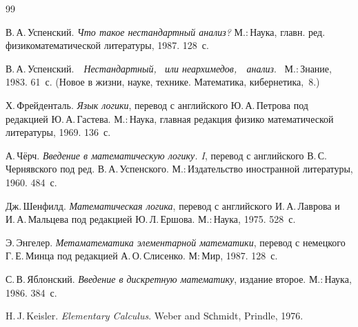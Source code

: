 \begin{thebibliography}{99}

В.\,А.\,Успенский. \textit{Что такое нестандартный анализ?}
М.:\,Нау\-ка, главн. ред. физико\д математической литературы,
1987. 128~с.


В.\,А.\,Успенский.\ \ \textit{Нестандартный, \ или неархимедов,\ \
анализ}. \ М.:\,Знание, 1983. 61~с. (Новое в жизни, науке, технике.
Математика, кибернетика, \номер\,8.)


Х.\,Фрейденталь. \textit{Язык логики}, перевод с английского Ю.\,А.\,Пет\-ро\-ва
под редакцией Ю.\,А.\,Гастева. М.:\,Наука, главная редакция физико\д
математичес\-кой литературы, 1969. 136~с.



А.\,Чёрч. \textit{Введение в математическую логику. I},
перевод с английского В.\,С.\,Чернявского под ред.
В.\,А.\,Успенского. М.:\,Из\-да\-тель\-с\-тво иностранной литературы,
1960. 484~с.


Дж.\,Шенфилд. \textit{Математическая логика},
перевод с английского И.\,А.\,Лаврова и И.\,А.\,Мальцева
под редакцией Ю.\,Л.\,Ершова. М.:\,Наука, 1975. 528~с.

Э.\,Энгелер. \textit{Метаматематика элементарной математики},
перевод с немецкого Г.\,Е.\,Минца под редакцией А.\,О.\,Слисенко.
М:\,Мир, 1987. 128~с.


С.\,В.\,Яблонский. \textit{Введение в дискретную матема\-тику},
издание второе. М.:\,Наука, 1986. 384~с.


H.\,J.\,Keisler. \textit{Elementary Calculus}.
Weber and Sсhmidt, Prindle, 1976.

\end{thebibliography}
